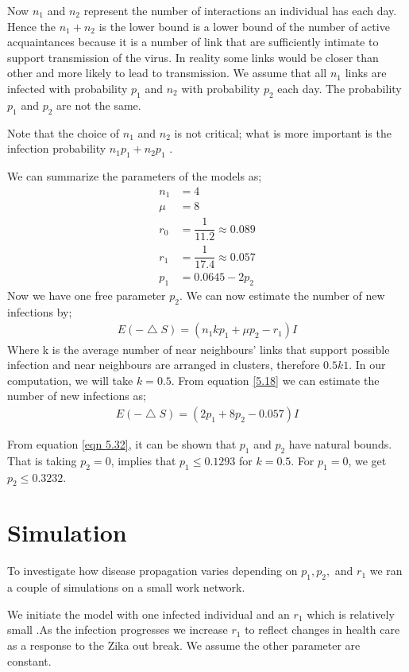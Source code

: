 Now $n_1$ and $n_2$ represent the number of interactions an individual has each day. Hence the  $n_1 + n_2$ is the lower bound is a lower bound of the number of active acquaintances because it is a number of link that are sufficiently intimate to support transmission of the virus. In reality some links would be closer than other and more likely to lead to transmission. We assume that all $n_1$ links are infected with probability $p_1$ and $n_2$ with probability $p_2$ each day. The probability $p_1$ and $p_2$ are not the same.

Note that the choice of $n_1$ and $n_2$ is not critical; what is more important is the infection probability $n_1p_1 + n_2p_1$ .

We can summarize the parameters of the models as;
\begin{align}
n_1 &= 4 \\
\mu &= 8 \\
r_0 &= \dfrac{1}{11.2} \approx 0.089 \\
r_1 &= \dfrac{1}{17.4} \approx 0.057 \\
p_1 &= 0.0645 - 2 p_2 \label{eqn 5.1.7}
\end{align}
Now we have one free parameter $p_2$. We can now estimate the number of new infections by;
\begin{align}
E(- \bigtriangleup S) = (n_1 k p_1 + \mu p_2 - r_1) I \label{5.18}
\end{align}
Where k is the average number of near neighbours' links that support possible infection and near neighbours are arranged in clusters, therefore $0.5 k 1$.  In our computation, we will take $k = 0.5$. From equation \ref{5.18} we can estimate the number of new infections as;
\begin{align}
E(- \bigtriangleup S) = (2 p_1 + 8 p_2 - 0.057) I  \label{5.1.9}
\end{align}
 
From equation \ref{eqn 5.32}, it can be shown that $p_1$ and $p_2$ have natural bounds. That is taking $p_2 = 0$, implies that $p_1 \leq 0.1293$ for $k =0. 5$. For $p_1 = 0$, we get $p_2 \leq 0.3232$.
\section{Simulation}
To investigate how disease propagation varies depending on $p_1, p_2, $ and $r_1$ we ran a couple of simulations on a small work network. 

We initiate the model with one infected individual and an $r_1$ which is relatively small .As the  infection progresses  we increase $r_1$ to reflect changes in health care as a response to the Zika out break. We assume the other parameter are constant.

